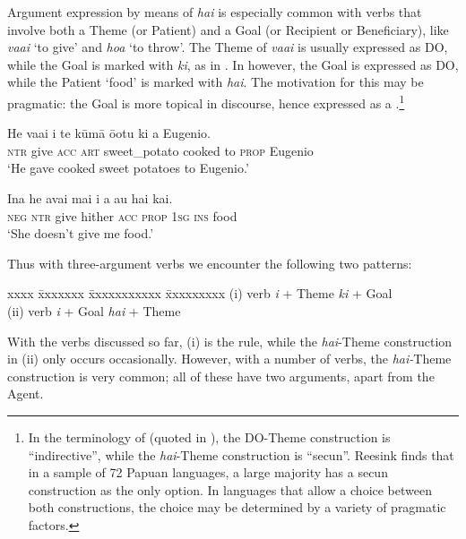 Argument expression by means of \textit{hai} is especially common with verbs that involve both a Theme (or Patient) and a Goal (or Recipient or Beneficiary), like \textit{va{\ꞌ}ai} ‘to give’ and \textit{hoa} ‘to throw’. The Theme of \textit{va{\ꞌ}ai} is usually expressed as DO, while the Goal is marked with \textit{ki}, as in . In  however, the Goal is expressed as DO, while the Patient ‘food’ is marked with \textit{hai}. The motivation for this may be pragmatic: the Goal is more topical in discourse, hence expressed as a .\footnote{\label{fn:440}In the terminology of \citealt{Haspelmath2005} (quoted in \citealt{Reesink2013}), the DO-Theme construction is “indirective”, while the \textit{hai}{}-Theme construction is “secun”. Reesink finds that in a sample of 72 Papuan languages, a large majority has a secun construction as the only option. In languages that allow a choice between both constructions, the choice may be determined by a variety of pragmatic factors.}

\ea\label{ex:8.134}
\gll He va{\ꞌ}ai i te kūmā {\ꞌ}ō{\ꞌ}otu ki a Eugenio. \\
\textsc{ntr} give \textsc{acc} \textsc{art} sweet\_potato cooked to \textsc{prop} Eugenio \\

\glt 
‘He gave cooked sweet potatoes to Eugenio.’ \textstyleExampleref{[R231.132]} 
\z

\ea\label{ex:8.135}
\gll {\ꞌ}Ina he {\ꞌ}avai mai i a au hai kai.\\
\textsc{neg} \textsc{ntr} give hither \textsc{acc} \textsc{prop} \textsc{1sg} \textsc{ins} food\\

\glt
‘She doesn’t give me food.’ \textstyleExampleref{[R229.414]} 
\z

Thus with three-argument verbs we encounter the following two patterns: 

\ea
\begin{tabbing}
xxxx \= xxxxxxx \= xxxxxxxxxxx \= xxxxxxxxx\kill
(i) \>  verb  \> \textit{i} + Theme  \> \textit{ki} + Goal\\
(ii) \>  verb  \> \textit{i} + Goal\textsubscript{}  \> \textit{hai} + Theme
\end{tabbing}
\z
With the verbs discussed so far, (i) is the rule, while the \textit{hai}{}-Theme construction in (ii) only occurs occasionally. However, with a number of verbs, the \textit{hai-}Theme construction is very common; all of these have two arguments, apart from the Agent.

